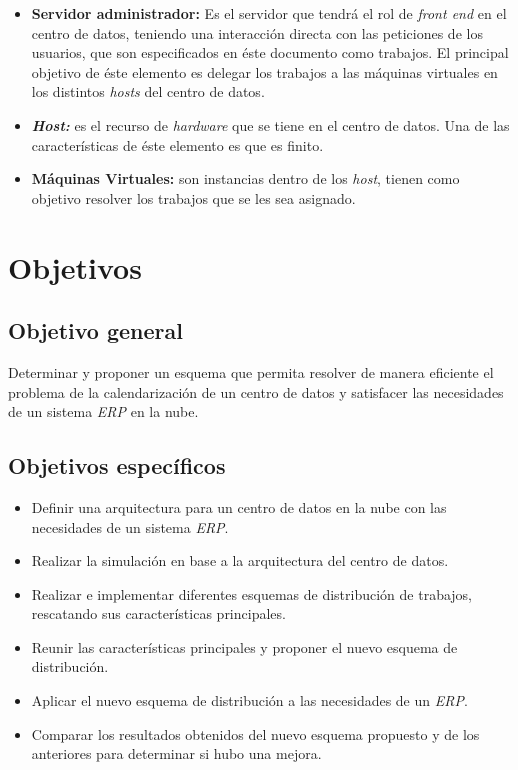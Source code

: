 \begin{itemize}
	\item \textbf{Servidor administrador:} Es el servidor que tendr\'a el rol de \textit{front end} en el centro de datos, teniendo una interacci\'on directa con las peticiones de los usuarios, que son especificados en \'este documento como trabajos.
	El principal objetivo de \'este elemento es delegar los trabajos a las m\'aquinas virtuales en los distintos \textit{hosts} del centro de datos.
	\item \textit{\textbf{Host:}} es el recurso de \textit{hardware} que se tiene en el centro de datos. Una de las caracter\'isticas de \'este elemento es que es finito.
	\item \textbf{M\'aquinas Virtuales:} son instancias dentro de los \textit{host}, tienen como objetivo resolver los trabajos que se les sea asignado.
\end{itemize}


\newpage

\section*{Objetivos}


\subsection*{Objetivo general}


Determinar y proponer un esquema que permita resolver de manera eficiente el problema de la calendarizaci\'on de un centro de datos y satisfacer las necesidades de un sistema \textit{ERP} en la nube.


\subsection*{Objetivos espec\'ificos}


\begin{itemize}
	\item Definir una arquitectura para un centro de datos en la nube con las necesidades de un sistema \textit{ERP}.
	\item Realizar la simulaci\'on en base a la arquitectura del centro de datos.
	\item Realizar e implementar diferentes esquemas de distribuci\'on de trabajos, rescatando sus caracter\'isticas principales.
	\item Reunir las caracter\'isticas principales y proponer el nuevo esquema de distribuci\'on.
	\item Aplicar el nuevo esquema de distribuci\'on a las necesidades de un \textit{ERP}.
	\item Comparar los resultados obtenidos del nuevo esquema propuesto y de los anteriores para determinar si hubo una mejora.
\end{itemize}


